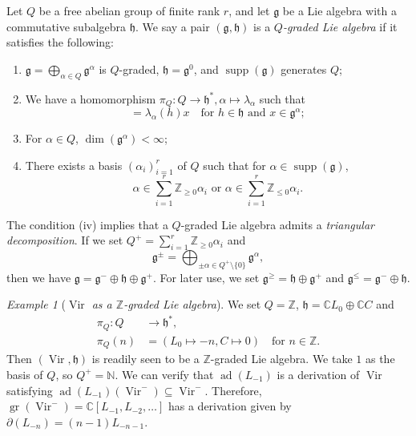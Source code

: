 \documentclass[a4paper, 12pt, reqno]{amsart}
\theoremstyle{remark}
\newtheorem{example}[theorem]{Example}
\DeclareMathOperator{\Vir}{Vir}
\DeclareMathOperator{\gr}{gr}
\DeclareMathOperator{\supp}{supp}
\DeclareMathOperator{\ad}{ad}
\begin{document}
Let $Q$ be a free abelian group of finite rank $r$, and let $\mathfrak{g}$ be a Lie algebra with a commutative subalgebra $\mathfrak{h}$.
We say a pair $(\mathfrak{g}, \mathfrak{h})$ is a \emph{$Q$-graded Lie algebra} if it satisfies the following:
\begin{enumerate}
\item $\mathfrak{g} = \bigoplus_{\alpha \in Q}\mathfrak{g}^{\alpha}$ is $Q$-graded, $\mathfrak{h} = \mathfrak{g}^0$, and $\supp(\mathfrak{g})$ generates $Q$;
\item We have a homomorphism $\pi_Q: Q \to \mathfrak{h}^*, \alpha \mapsto \lambda_{\alpha}$ such  that
  \begin{equation*}
    [h, x] = \lambda_{\alpha}(h)x \quad \text{for $h \in \mathfrak{h}$ and $x \in \mathfrak{g}^{\alpha}$};
  \end{equation*}
\item For $\alpha \in Q$, $\dim(\mathfrak{g}^{\alpha}) < \infty$;
\item There exists a basis $(\alpha_i)_{i = 1}^r$ of $Q$ such that for $\alpha \in \supp(\mathfrak{g})$,
  \begin{equation*}
    \text{$\alpha \in \sum_{i = 1}^r\mathbb{Z}_{\ge 0}\alpha_i$ or $\alpha \in \sum_{i = 1}^r\mathbb{Z}_{\le 0}\alpha_i$}.
  \end{equation*}
\end{enumerate}

The condition (iv) implies that a $Q$-graded Lie algebra admits a \emph{triangular decomposition}.
If we set $Q^+ = \sum_{i = 1}^r\mathbb{Z}_{\ge 0}\alpha_i$ and
\begin{equation*}
  \mathfrak{g}^{\pm} = \bigoplus_{\pm \alpha \in Q^+ \setminus \{0\}}\mathfrak{g}^{\alpha},
\end{equation*}
then we have $\mathfrak{g} = \mathfrak{g}^- \oplus \mathfrak{h} \oplus \mathfrak{g}^+$.
For later use, we set $\mathfrak{g}^{\ge} = \mathfrak{h} \oplus \mathfrak{g}^+$ and $\mathfrak{g}^{\le} = \mathfrak{g}^- \oplus \mathfrak{h}$.

\begin{example}[\emph{$\Vir$ as a $\mathbb{Z}$-graded Lie algebra}]
  \label{exa:2}
  We set $Q = \mathbb{Z}$, $\mathfrak{h} = \mathbb{C}L_0 \oplus \mathbb{C}C$ and
  \begin{align*}
    \pi_Q: Q &\to \mathfrak{h}^*, \\
    \pi_Q(n) &= (L_0 \mapsto -n, C \mapsto 0) \quad \text{for $n \in \mathbb{Z}$}.
  \end{align*}
  Then $(\Vir, \mathfrak{h})$ is readily seen to be a $\mathbb{Z}$-graded Lie algebra.
  We take $1$ as the basis of $Q$, so $Q^+ = \mathbb{N}$.
  We can verify that $\ad(L_{-1})$ is a derivation of $\Vir$ satisfying $\ad(L_{-1})(\Vir^-) \subseteq \Vir^-$.
  Therefore, $\gr(\Vir^-) = \mathbb{C}[L_{-1}, L_{-2}, \dots]$ has a derivation given by $\partial(L_{-n}) = (n - 1)L_{-n - 1}$.
\end{example}
\end{document}
